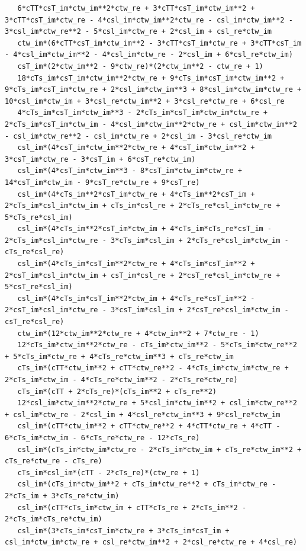 \documentclass[
  10pt,
]{article}
\begin{document}
\begin{verbatim}
   6*cTT*csT_im*ctw_im**2*ctw_re + 3*cTT*csT_im*ctw_im**2 + 3*cTT*csT_im*ctw_re - 4*csl_im*ctw_im**2*ctw_re - csl_im*ctw_im**2 - 3*csl_im*ctw_re**2 - 5*csl_im*ctw_re + 2*csl_im + csl_re*ctw_im
   ctw_im*(6*cTT*csT_im*ctw_im**2 - 3*cTT*csT_im*ctw_re + 3*cTT*csT_im - 4*csl_im*ctw_im**2 - 4*csl_im*ctw_re - 2*csl_im + 6*csl_re*ctw_im)
   csT_im*(2*ctw_im**2 - 9*ctw_re)*(2*ctw_im**2 - ctw_re + 1)
   18*cTs_im*csT_im*ctw_im**2*ctw_re + 9*cTs_im*csT_im*ctw_im**2 + 9*cTs_im*csT_im*ctw_re + 2*csl_im*ctw_im**3 + 8*csl_im*ctw_im*ctw_re + 10*csl_im*ctw_im + 3*csl_re*ctw_im**2 + 3*csl_re*ctw_re + 6*csl_re
   4*cTs_im*csT_im*ctw_im**3 - 2*cTs_im*csT_im*ctw_im*ctw_re + 2*cTs_im*csT_im*ctw_im - 4*csl_im*ctw_im**2*ctw_re + csl_im*ctw_im**2 - csl_im*ctw_re**2 - csl_im*ctw_re + 2*csl_im - 3*csl_re*ctw_im
   csl_im*(4*csT_im*ctw_im**2*ctw_re + 4*csT_im*ctw_im**2 + 3*csT_im*ctw_re - 3*csT_im + 6*csT_re*ctw_im)
   csl_im*(4*csT_im*ctw_im**3 - 8*csT_im*ctw_im*ctw_re + 14*csT_im*ctw_im - 9*csT_re*ctw_re + 9*csT_re)
   csl_im*(4*cTs_im**2*csT_im*ctw_re + 4*cTs_im**2*csT_im + 2*cTs_im*csl_im*ctw_im + cTs_im*csl_re + 2*cTs_re*csl_im*ctw_re + 5*cTs_re*csl_im)
   csl_im*(4*cTs_im**2*csT_im*ctw_im + 4*cTs_im*cTs_re*csT_im - 2*cTs_im*csl_im*ctw_re - 3*cTs_im*csl_im + 2*cTs_re*csl_im*ctw_im - cTs_re*csl_re)
   csl_im*(4*cTs_im*csT_im**2*ctw_re + 4*cTs_im*csT_im**2 + 2*csT_im*csl_im*ctw_im + csT_im*csl_re + 2*csT_re*csl_im*ctw_re + 5*csT_re*csl_im)
   csl_im*(4*cTs_im*csT_im**2*ctw_im + 4*cTs_re*csT_im**2 - 2*csT_im*csl_im*ctw_re - 3*csT_im*csl_im + 2*csT_re*csl_im*ctw_im - csT_re*csl_re)
   ctw_im*(12*ctw_im**2*ctw_re + 4*ctw_im**2 + 7*ctw_re - 1)
   12*cTs_im*ctw_im**2*ctw_re - cTs_im*ctw_im**2 - 5*cTs_im*ctw_re**2 + 5*cTs_im*ctw_re + 4*cTs_re*ctw_im**3 + cTs_re*ctw_im
   cTs_im*(cTT*ctw_im**2 + cTT*ctw_re**2 - 4*cTs_im*ctw_im*ctw_re + 2*cTs_im*ctw_im - 4*cTs_re*ctw_im**2 - 2*cTs_re*ctw_re)
   cTs_im*(cTT + 2*cTs_re)*(cTs_im**2 + cTs_re**2)
   12*csl_im*ctw_im**2*ctw_re + 5*csl_im*ctw_im**2 + csl_im*ctw_re**2 + csl_im*ctw_re - 2*csl_im + 4*csl_re*ctw_im**3 + 9*csl_re*ctw_im
   csl_im*(cTT*ctw_im**2 + cTT*ctw_re**2 + 4*cTT*ctw_re + 4*cTT - 6*cTs_im*ctw_im - 6*cTs_re*ctw_re - 12*cTs_re)
   csl_im*(cTs_im*ctw_im*ctw_re - 2*cTs_im*ctw_im + cTs_re*ctw_im**2 + cTs_re*ctw_re - cTs_re)
   cTs_im*csl_im*(cTT - 2*cTs_re)*(ctw_re + 1)
   csl_im*(cTs_im*ctw_im**2 + cTs_im*ctw_re**2 + cTs_im*ctw_re - 2*cTs_im + 3*cTs_re*ctw_im)
   csl_im*(cTT*cTs_im*ctw_im + cTT*cTs_re + 2*cTs_im**2 - 2*cTs_im*cTs_re*ctw_im)
   csl_im*(3*cTs_im*csT_im*ctw_re + 3*cTs_im*csT_im + csl_im*ctw_im*ctw_re + csl_re*ctw_im**2 + 2*csl_re*ctw_re + 4*csl_re)

\end{verbatim}
\end{document}
